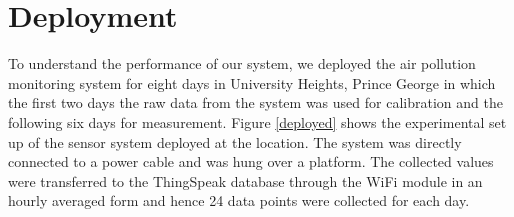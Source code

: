 \section{Deployment}

To understand the performance of our system, we deployed the air pollution monitoring system for eight days in University Heights, Prince George in which the first two days the raw data from the system was used for calibration and the following six days for measurement. Figure \ref{deployed} shows the experimental set up of the sensor system deployed at the location. The system was directly connected to a power cable and was hung over a platform. The collected values were transferred to the ThingSpeak database through the WiFi module in an hourly averaged form and hence 24 data points were collected for each day.

